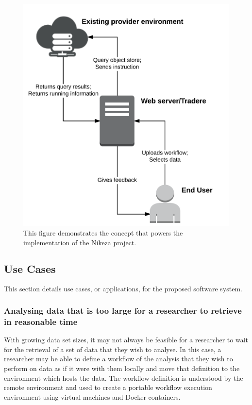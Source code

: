 \begin{figure}[ht!]
\centering
\includegraphics[width=\textwidth]{Figures/2_existing_provider_environment.png}
\decoRule
\caption[Nikeza System Context]{This figure demonstrates the concept that powers the implementation of the Nikeza project.}
\label{fig:existing_provider_environment}
\end{figure}

\subsection{Use Cases}

This section details use cases, or applications, for the proposed software system.

\subsubsection{Analysing data that is too large for a researcher to retrieve in reasonable time}

With growing data set sizes, it may not always be feasible for a researcher to wait for the retrieval of a set of data that they wish to analyse. In this case, a researcher may be able to define a workflow of the analysis that they wish to perform on data as if it were with them locally and move that definition to the environment which hosts the data. The workflow definition is understood by the remote environment and used to create a portable workflow execution environment using virtual machines and Docker containers.

